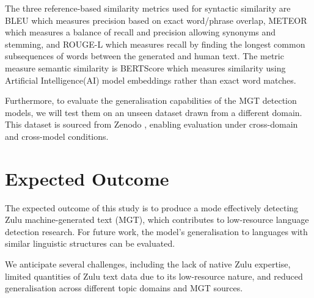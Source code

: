 \documentclass[11pt, a4paper,twocolumn]{article}
\begin{document}
The three reference-based similarity metrics used for syntactic similarity are BLEU which measures precision based on exact word/phrase overlap, METEOR which measures a balance of recall and precision allowing synonyms and stemming, and ROUGE-L which measures recall by finding the longest common subsequences of words between the generated and human text. The metric measure semantic similarity is BERTScore which measures similarity using Artificial Intelligence(AI) model embeddings rather than exact word matches.

Furthermore, to evaluate the generalisation capabilities of the MGT detection models, we will test them on an unseen dataset drawn from a different domain. This dataset is sourced from Zenodo \citep{zenodo5035171}, enabling evaluation under cross-domain and cross-model conditions.

    \section{Expected Outcome}
The expected outcome of this study is to produce a mode effectively detecting Zulu machine-generated text (MGT), which contributes to low-resource language detection research. For future work, the model’s generalisation to languages with similar linguistic structures can be evaluated.

We anticipate several challenges, including the lack of native Zulu expertise, limited quantities of Zulu text data due to its low-resource nature, and reduced generalisation across different topic domains and MGT sources.


%

    
\end{document}

